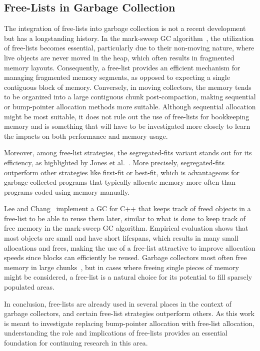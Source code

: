 \subsection{Free-Lists in Garbage Collection}

The integration of free-lists into garbage collection is not a recent development but has a longstanding history. In the mark-sweep GC algorithm~\cite{mark_sweep}, the utilization of free-lists becomes essential, particularly due to their non-moving nature, where live objects are never moved in the heap, which often results in fragmented memory layouts. Consequently, a free-list provides an efficient mechanism for managing fragmented memory segments, as opposed to expecting a single contiguous block of memory. Conversely, in moving collectors, the memory tends to be organized into a large contiguous chunk post-compaction, making sequential or bump-pointer allocation methods more suitable. Although sequential allocation might be most suitable, it does not rule out the use of free-lists for bookkeeping memory and is something that will have to be investigated more closely to learn the impacts on both performance and memory usage.

Moreover, among free-list strategies, the segregated-fits variant stands out for its efficiency, as highlighted by Jones et al.~\cite[Section 7.8]{gchandbook}. More precisely, segregated-fits outperform other strategies like first-fit or best-fit, which is advantageous for garbage-collected programs that typically allocate memory more often than programs coded using memory manually.

Lee and Chang~\cite{samsung_gc_free_list} implement a GC for C++ that keeps track of freed objects in a free-list to be able to reuse them later, similar to what is done to keep track of free memory in the mark-sweep GC algorithm. Empirical evaluation shows that most objects are small and have short lifespans, which results in many small allocations and frees, making the use of a free-list attractive to improve allocation speeds since blocks can efficiently be reused. Garbage collectors most often free memory in large chunks~\cite[Section 7.8]{gchandbook}, but in cases where freeing single pieces of memory might be considered, a free-list is a natural choice for its potential to fill sparsely populated areas.

In conclusion, free-lists are already used in several places in the context of garbage collectors, and certain free-list strategies outperform others. As this work is meant to investigate replacing bump-pointer allocation with free-list allocation, understanding the role and implications of free-lists provides an essential foundation for continuing research in this area.

